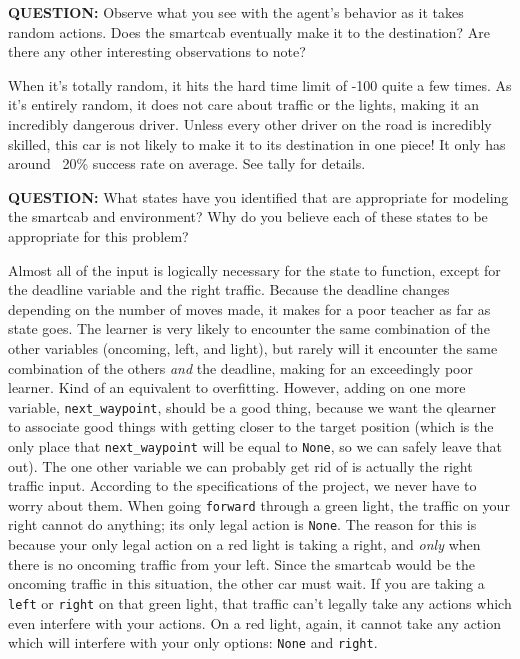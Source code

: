 \documentclass[11pt]{article}
\begin{document}
\noindent
\textbf{QUESTION:} Observe what you see with the agent's behavior as it takes random actions. Does the smartcab eventually make it to the destination? Are there any other interesting observations to note?

When it's totally random, it hits the hard time limit of -100 quite a few times. As it's entirely random, it does not care about traffic or the lights, making it an incredibly dangerous driver. Unless every other driver on the road is incredibly skilled, this car is not likely to make it to its destination in one piece! It only has around ~20\% success rate on average. See tally for details.

\noindent
\textbf{QUESTION:} What states have you identified that are appropriate for modeling the smartcab and environment? Why do you believe each of these states to be appropriate for this problem?

Almost all of the input is logically necessary for the state to function, except for the deadline variable and the right traffic. Because the deadline changes depending on the number of moves made, it makes for a poor teacher as far as state goes. The learner is very likely to encounter the same combination of the other variables (oncoming, left, and light), but rarely will it encounter the same combination of the others \emph{and} the deadline, making for an exceedingly poor learner. Kind of an equivalent to overfitting. However, adding on one more variable, \texttt{next\_waypoint}, should be a good thing, because we want the qlearner to associate good things with getting closer to the target position (which is the only place that \texttt{next\_waypoint} will be equal to \texttt{None}, so we can safely leave that out). The one other variable we can probably get rid of is actually the right traffic input. According to the specifications of the project, we never have to worry about them. When going \texttt{forward} through a green light, the traffic on your right cannot do anything; its only legal action is \texttt{None}. The reason for this is because your only legal action on a red light is taking a right, and \emph{only} when there is no oncoming traffic from your left. Since the smartcab would be the oncoming traffic in this situation, the other car must wait. If you are taking a \texttt{left} or \texttt{right} on that green light, that traffic can't legally take any actions which even interfere with your actions. On a red light, again, it cannot take any action which will interfere with your only options: \texttt{None} and \texttt{right}.
\end{document}
